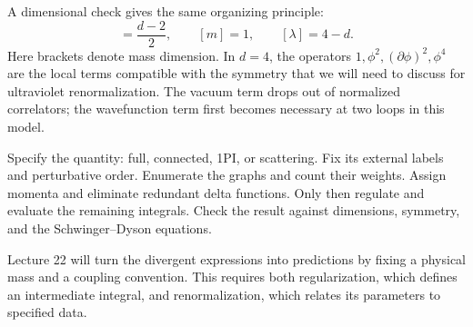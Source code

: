 \documentclass[11pt]{article}
\begin{document}
A dimensional check gives the same organizing principle:
\begin{equation}
 [\phi]=\frac{d-2}{2},\qquad [m]=1,\qquad[\lambda]=4-d.
\end{equation}
Here brackets denote mass dimension. In \(d=4\), the operators
\(1,\phi^2,(\partial\phi)^2,\phi^4\) are the local terms compatible
with the symmetry that we will need to discuss for ultraviolet
renormalization. The vacuum term drops out of normalized correlators;
the wavefunction term first becomes necessary at two loops in this model.

\begin{keyidea}
Specify the quantity: full, connected, 1PI, or scattering. Fix its
external labels and perturbative order. Enumerate the graphs and
count their weights. Assign momenta and eliminate redundant delta
functions. Only then regulate and evaluate the remaining integrals.
Check the result against dimensions, symmetry, and the
Schwinger--Dyson equations.
\end{keyidea}
Lecture 22 will turn the divergent expressions into predictions by
fixing a physical mass and a coupling convention. This requires both
regularization, which defines an intermediate integral, and
renormalization, which relates its parameters to specified data.

\end{document}
